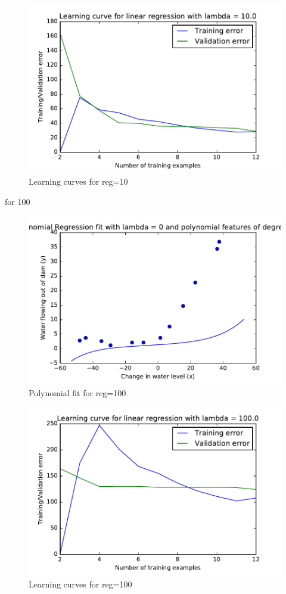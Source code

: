 \documentclass[pdftex,11pt]{article}
\begin{document}
\begin{figure}
  \caption{Learning curves for reg=10}
  \centering
    \includegraphics[scale=1]{fig1010.pdf}
\end{figure}
for 100
\begin{figure}
  \caption{Polynomial fit for reg=100}
  \centering
    \includegraphics[scale=1]{fig9100.pdf}
\end{figure}
\begin{figure}
  \caption{Learning curves for  reg=100}
  \centering
    \includegraphics[scale=1]{fig10100.pdf}
\end{figure}
\end{document}
